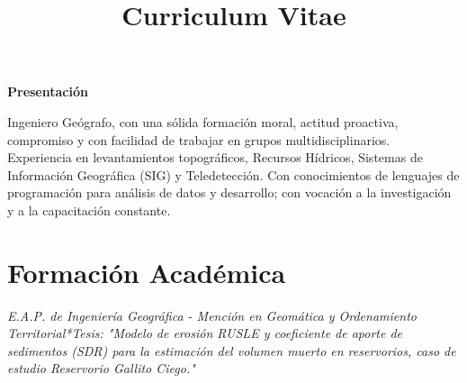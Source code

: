 \documentclass[11pt,a4paper,sans]{moderncv} %
\title{Curriculum Vitae}
\begin{document}
\makecvtitle %

\begin{center}

\textbf{\textcolor{color1}{\Large{Presentación}}}
\vspace{2mm}
 
Ingeniero Geógrafo, con una sólida formación moral, actitud proactiva, compromiso y con facilidad de trabajar en grupos multidisciplinarios.\\
Experiencia en levantamientos topográficos, Recursos Hídricos, Sistemas de Información Geográfica (SIG) y Teledetección. Con conocimientos de lenguajes de programación para análisis de datos y desarrollo; con vocación a la investigación y a la capacitación constante.

\end{center}
\vspace{0mm}


\section{Formación Académica}

\textit{E.A.P. de Ingeniería Geográfica - Mención en Geomática y Ordenamiento Territorial}{\textit{*Tesis: "Modelo de erosión RUSLE y coeficiente de aporte de sedimentos (SDR) para la estimación del volumen muerto en reservorios, caso de estudio Reservorio Gallito Ciego."}}

\vspace{0mm}
\end{document}
